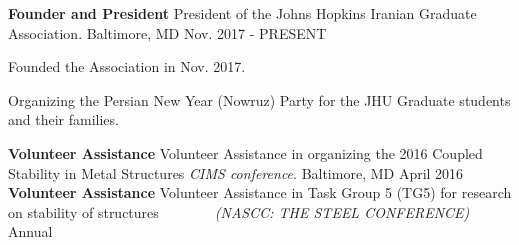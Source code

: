 \begin{cventries}
  \cventry
    {\textbf{Founder and President}} %
    {President of the Johns Hopkins Iranian Graduate Association.} %
    {Baltimore, MD} %
    {Nov. 2017 - PRESENT} %
    {
      \begin{cvitems} %
      	\item {Founded the Association in Nov. 2017.}
        \item {Organizing the Persian New Year (Nowruz) Party for the JHU Graduate students and their families.}
              \end{cvitems}
    }
  \cventry
{\textbf{Volunteer Assistance}} %
{Volunteer Assistance in organizing the 2016 Coupled Stability in Metal Structures \textit{CIMS conference}. } %
{Baltimore, MD} %
{April 2016} %
{
}
\cventry
{\textbf{Volunteer Assistance}} %
{Volunteer Assistance in Task Group 5 (TG5) for research on stability of structures $\hspace{40pt}$ \textit{(NASCC: THE STEEL CONFERENCE)} } %
{} %
{Annual} %
{
}

\end{cventries}
